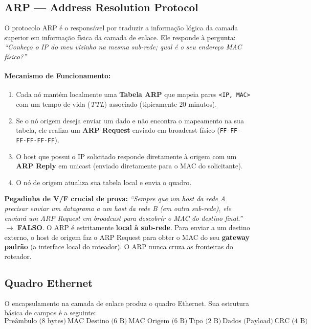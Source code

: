 \documentclass[11pt,a4paper]{article}
\begin{document}
\subsection{ARP --- Address Resolution Protocol}

O protocolo ARP é o responsável por traduzir a informação lógica da camada superior em informação física da camada de enlace. Ele responde à pergunta: \emph{``Conheço o IP do meu vizinho na mesma sub-rede; qual é o seu endereço MAC físico?''}

\paragraph{Mecanismo de Funcionamento:}
\begin{enumerate}
    \item Cada nó mantém localmente uma \textbf{Tabela ARP} que mapeia pares \texttt{<IP, MAC>} com um tempo de vida (\emph{TTL}) associado (tipicamente 20 minutos).
    \item Se o nó origem deseja enviar um dado e não encontra o mapeamento na sua tabela, ele realiza um \textbf{ARP Request} enviado em broadcast físico (\texttt{FF-FF-FF-FF-FF-FF}).
    \item O host que possui o IP solicitado responde diretamente à origem com um \textbf{ARP Reply} em unicast (enviado diretamente para o MAC do solicitante).
    \item O nó de origem atualiza sua tabela local e envia o quadro.
\end{enumerate}

\begin{nota}
\textbf{Pegadinha de V/F crucial de prova:} \emph{``Sempre que um host da rede A precisar enviar um datagrama a um host da rede B (em outra sub-rede), ele enviará um ARP Request em broadcast para descobrir o MAC do destino final.''} $\to$ \textbf{FALSO}.
O ARP é estritamente \textbf{local à sub-rede}. Para enviar a um destino externo, o host de origem faz o ARP Request para obter o MAC do seu \textbf{gateway padrão} (a interface local do roteador). O ARP nunca cruza as fronteiras do roteador.
\end{nota}

\subsection{Quadro Ethernet}

O encapsulamento na camada de enlace produz o quadro Ethernet. Sua estrutura básica de campos é a seguinte:
\[
\boxed{\text{Preâmbulo (8 bytes)}} \ \boxed{\text{MAC Destino (6 B)}} \ \boxed{\text{MAC Origem (6 B)}} \ \boxed{\text{Tipo (2 B)}} \ \boxed{\text{Dados (Payload)}} \ \boxed{\text{CRC (4 B)}}
\]
\end{document}
